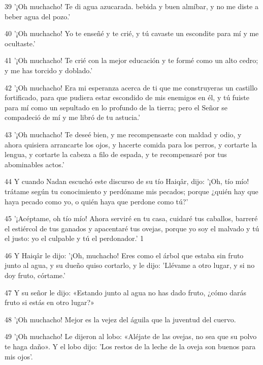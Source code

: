 \par 39 '¡Oh muchacho! Te di agua azucarada. bebida y buen almíbar, y no me diste a beber agua del pozo.'

\par 40 '¡Oh muchacho! Yo te enseñé y te crié, y tú cavaste un escondite para mí y me ocultaste.'

\par 41 '¡Oh muchacho! Te crié con la mejor educación y te formé como un alto cedro; y me has torcido y doblado.'

\par 42 '¡Oh muchacho! Era mi esperanza acerca de ti que me construyeras un castillo fortificado, para que pudiera estar escondido de mis enemigos en él, y tú fuiste para mí como un sepultado en lo profundo de la tierra; pero el Señor se compadeció de mí y me libró de tu astucia.'

\par 43 '¡Oh muchacho! Te deseé bien, y me recompensaste con maldad y odio, y ahora quisiera arrancarte los ojos, y hacerte comida para los perros, y cortarte la lengua, y cortarte la cabeza a filo de espada, y te recompensaré por tus abominables actos.'

\par 44 Y cuando Nadan escuchó este discurso de su tío Haiqâr, dijo: '¡Oh, tío mío! trátame según tu conocimiento y perdóname mis pecados; porque ¿quién hay que haya pecado como yo, o quién haya que perdone como tú?'

\par 45 '¡Acéptame, oh tío mío! Ahora serviré en tu casa, cuidaré tus caballos, barreré el estiércol de tus ganados y apacentaré tus ovejas, porque yo soy el malvado y tú el justo: yo el culpable y tú el perdonador.' 1

\par 46 Y Haiqâr le dijo: '¡Oh, muchacho! Eres como el árbol que estaba sin fruto junto al agua, y su dueño quiso cortarlo, y le dijo: 'Llévame a otro lugar, y si no doy fruto, córtame.'

\par 47 Y su señor le dijo: «Estando junto al agua no has dado fruto, ¿cómo darás fruto si estás en otro lugar?»

\par 48 '¡Oh muchacho! Mejor es la vejez del águila que la juventud del cuervo.

\par 49 '¡Oh muchacho! Le dijeron al lobo: «Aléjate de las ovejas, no sea que su polvo te haga daño». Y el lobo dijo: 'Los restos de la leche de la oveja son buenos para mis ojos'.

